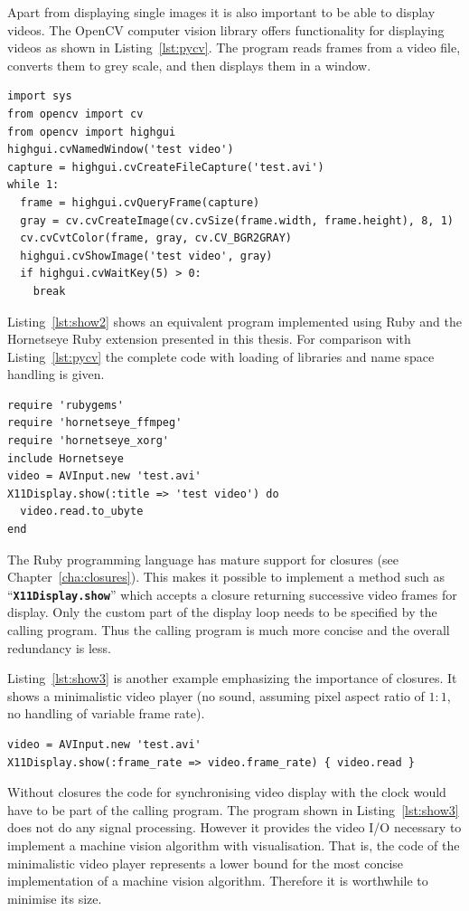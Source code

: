 \documentclass[12pt,a4paper,oneside,openright]{book}
\newcommand{\Ie}{That is, }
\newcommand{\cha}[1]{Chapter~\ref{cha:#1}}
\newcommand{\lst}[1]{Listing~\ref{lst:#1}}
\newcommand{\code}[1]{``\texttt{\textbf{\textcolor{codegray}{\small{#1}}}}''}
\begin{document}
\begin{CJK}{UTF8}{}
Apart from displaying single images it is also important to be able to display videos. The OpenCV computer vision library offers functionality for displaying videos as shown in \lst{pycv}. The program reads frames from a video file, converts them to grey scale, and then displays them in a window.
\lstset{language=Python,frame=single,numbers=none}
\begin{lstlisting}[float,caption={Displaying a video using Python and OpenCV},label=lst:pycv]
import sys
from opencv import cv
from opencv import highgui
highgui.cvNamedWindow('test video')
capture = highgui.cvCreateFileCapture('test.avi')
while 1:
  frame = highgui.cvQueryFrame(capture)
  gray = cv.cvCreateImage(cv.cvSize(frame.width, frame.height), 8, 1)
  cv.cvCvtColor(frame, gray, cv.CV_BGR2GRAY)
  highgui.cvShowImage('test video', gray)
  if highgui.cvWaitKey(5) > 0:
    break
\end{lstlisting}

\lst{show2} shows an equivalent program implemented using Ruby and the Hornetseye Ruby extension presented in this thesis. For comparison with \lst{pycv} the complete code with loading of libraries and name space handling is given.
\lstset{language=Ruby,frame=single,numbers=none}
\begin{lstlisting}[float,caption={Displaying a video using Ruby and Hornetseye},label=lst:show2]
require 'rubygems'
require 'hornetseye_ffmpeg'
require 'hornetseye_xorg'
include Hornetseye
video = AVInput.new 'test.avi'
X11Display.show(:title => 'test video') do
  video.read.to_ubyte
end
\end{lstlisting}
The Ruby programming language has mature support for closures (see \cha{closures}). This makes it possible to implement a method such as \code{X11Display.show} which accepts a closure returning successive video frames for display. Only the custom part of the display loop needs to be specified by the calling program. Thus the calling program is much more concise and the overall redundancy is less.

\lst{show3} is another example emphasizing the importance of closures. It shows a minimalistic video player (no sound, assuming pixel aspect ratio of $1:1$, no handling of variable frame rate).
\lstset{language=Ruby,frame=single,numbers=none}
\begin{lstlisting}[float,caption={Minimalistic video player},label=lst:show3]
video = AVInput.new 'test.avi'
X11Display.show(:frame_rate => video.frame_rate) { video.read }
\end{lstlisting}
Without closures the code for synchronising video display with the clock would have to be part of the calling program. The program shown in \lst{show3} does not do any signal processing. However it provides the video \ac{I}/\ac{O} necessary to implement a machine vision algorithm with visualisation. \Ie the code of the minimalistic video player represents a lower bound for the most concise implementation of a machine vision algorithm. Therefore it is worthwhile to minimise its size.


\end{CJK}
\end{document}
